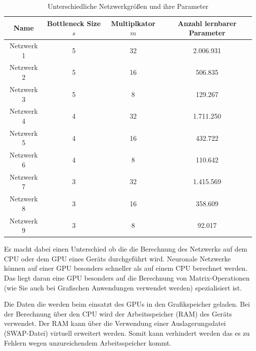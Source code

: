 \begin{table}[H]
    \centering
    \begin{tabular}{ |c|c|c|c| }
        \hline
        \textbf{Name} & \textbf{Bottleneck Size $ s $} & \textbf{Multiplkator $ m $} & \textbf{Anzahl lernbarer Parameter} \\ \hline
        Netzwerk 1 & 5 & 32 & 2.006.931 \\ \hline
        Netzwerk 2 & 5 & 16 & 506.835 \\ \hline
        Netzwerk 3 & 5 & 8  & 129.267 \\ \hline

        Netzwerk 4 & 4 & 32 & 1.711.250 \\ \hline
        Netzwerk 5 & 4 & 16 & 432.722 \\ \hline
        Netzwerk 6 & 4 & 8  & 110.642 \\ \hline

        Netzwerk 7 & 3 & 32 & 1.415.569 \\ \hline
        Netzwerk 8 & 3 & 16 & 358.609 \\ \hline
        Netzwerk 9 & 3 & 8  & 92.017 \\ \hline
    \end{tabular}
    \caption{Unterschiedliche Netzwerkgrößen und ihre Parameter}
    \label{tab:networks}
\end{table}

Es macht dabei einen Unterschied ob die die Berechnung des Netzwerks auf dem CPU oder dem GPU eines Geräts durchgeführt wird. Neuronale Netzwerke können auf einer GPU besonders schneller als auf einem CPU berechnet werden. Das liegt daran eine GPU besonders auf die Berechnung von Matrix-Operationen (wie Sie auch bei Grafischen Anwendungen verwendet werden) spezialisiert ist.

Die Daten die werden beim einsatzt des GPUs in den Grafikspeicher geladen. Bei der Berechnung über den CPU wird der Arbeitsspeicher (RAM) des Geräts verwendet. Der RAM kann über die Verwendung einer Auslagerungsdatei (SWAP-Datei) virtuell erweitert werden. Somit kann verhindert werden das es zu Fehlern wegen unzureichendem Arbeitsspeicher kommt.

